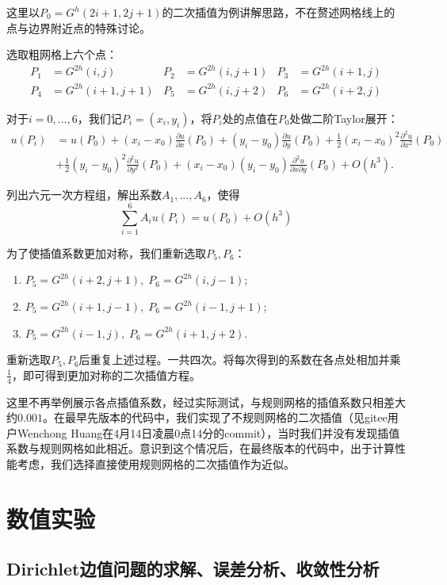 \documentclass[lang=cn,10pt]{elegantbook}
\begin{document}
这里以$P_0=G^{h}(2i+1,2j+1)$的二次插值为例讲解思路，不在赘述网格线上的点与边界附近点的特殊讨论。

选取粗网格上六个点：
\begin{align*}
  P_1&=G^{2h}(i,j) & P_2&=G^{2h}(i,j+1) & P_3&=G^{2h}(i+1,j)\\
  P_4&=G^{2h}(i+1,j+1) & P_5&=G^{2h}(i,j+2) & P_6&=G^{2h}(i+2,j)
\end{align*}

对于$i=0,...,6$，我们记$P_i=(x_i,y_i)$，将$P_i$处的点值在$P_0$处做二阶Taylor展开：
\begin{align*}
  u(P_i)&=u(P_0)+(x_i-x_0)\frac{\partial u}{\partial x}(P_0)+(y_i-y_0)\frac{\partial u}{\partial y}(P_0)
  +\frac{1}{2}(x_i-x_0)^2\frac{\partial^2 u}{\partial x^2}(P_0) \\
  & +\frac{1}{2}(y_i-y_0)^2\frac{\partial^2 u}{\partial y^2}(P_0)
  +(x_i-x_0)(y_i-y_0)\frac{\partial^2 u}{\partial x \partial y}(P_0)+O(h^3).
\end{align*}

列出六元一次方程组，解出系数$A_1,...,A_6$，使得
\begin{equation*}
  \sum_{i=1}^6 A_iu(P_i)=u(P_0)+O(h^3)
\end{equation*}

为了使插值系数更加对称，我们重新选取$P_5,P_6$：
\begin{enumerate}
  \item $P_5=G^{2h}(i+2,j+1),\;P_6=G^{2h}(i,j-1)$;
  \item $P_5=G^{2h}(i+1,j-1),\;P_6=G^{2h}(i-1,j+1)$;
  \item $P_5=G^{2h}(i-1,j),\;P_6=G^{2h}(i+1,j+2)$.
\end{enumerate}

重新选取$P_5,P_6$后重复上述过程。一共四次。将每次得到的系数在各点处相加并乘$\frac{1}{4}$，即可得到更加对称的二次插值方程。

这里不再举例展示各点插值系数，经过实际测试，与规则网格的插值系数只相差大约$0.001$。在最早先版本的代码中，我们实现了不规则网格的二次插值（见gitee用户Wenchong Huang在4月14日凌晨0点14分的commit），当时我们并没有发现插值系数与规则网格如此相近。意识到这个情况后，在最终版本的代码中，出于计算性能考虑，我们选择直接使用规则网格的二次插值作为近似。

\section{数值实验}

\subsection{Dirichlet边值问题的求解、误差分析、收敛性分析}
\end{document}
